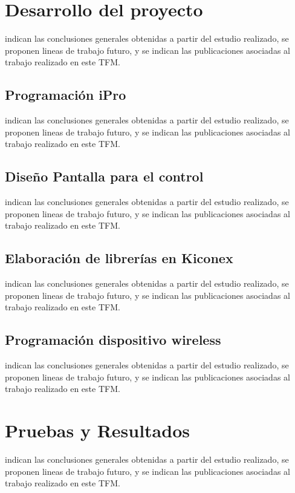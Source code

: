 \documentclass[a4paper, 12pt]{book}
\renewcommand{\thesection}{\arabic{section}}
\renewcommand{\thesubsection}{\thesection . \arabic{subsection} }
\begin{document}


\renewcommand{\thesection}{\thechapter.\arabic{section}}
\renewcommand{\thesubsection}{\thesection.\arabic{subsection}}



\cleardoublepage
\chapter{Desarrollo del proyecto}
\label{chap:desarrollo}
indican las conclusiones generales obtenidas a partir del estudio realizado, se proponen lineas de trabajo futuro, y se indican las publicaciones asociadas al trabajo realizado en este TFM.
\section{Programación iPro}
\label{sec:programacionipro}
indican las conclusiones generales obtenidas a partir del estudio realizado, se proponen lineas de trabajo futuro, y se indican las publicaciones asociadas al trabajo realizado en este TFM.
\section{Diseño Pantalla para el control}
\label{sec:programacionpantalla}
indican las conclusiones generales obtenidas a partir del estudio realizado, se proponen lineas de trabajo futuro, y se indican las publicaciones asociadas al trabajo realizado en este TFM.
\section{Elaboración de librerías en Kiconex}
\label{sec:librerias}
indican las conclusiones generales obtenidas a partir del estudio realizado, se proponen lineas de trabajo futuro, y se indican las publicaciones asociadas al trabajo realizado en este TFM.
\section{Programación dispositivo wireless}
\label{sec:programacionesp32}
indican las conclusiones generales obtenidas a partir del estudio realizado, se proponen lineas de trabajo futuro, y se indican las publicaciones asociadas al trabajo realizado en este TFM.


\cleardoublepage
\chapter{Pruebas y Resultados}
\label{chap:resultados}
indican las conclusiones generales obtenidas a partir del estudio realizado, se proponen lineas de trabajo futuro, y se indican las publicaciones asociadas al trabajo realizado en este TFM.
\end{document}
